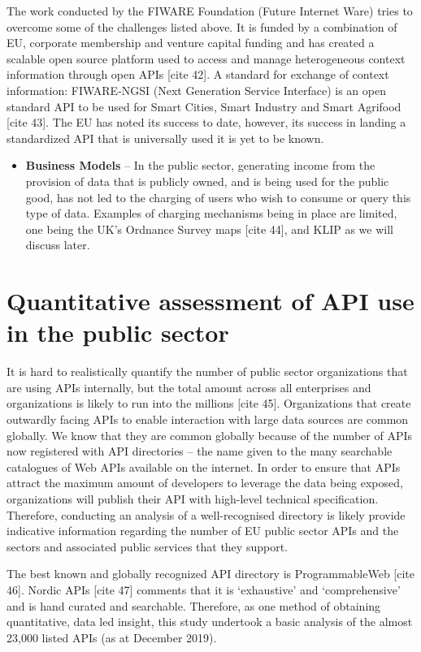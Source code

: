 The work conducted by the FIWARE Foundation (Future Internet Ware) tries to
overcome some of the challenges listed above. It is funded by a combination
of EU, corporate membership and venture capital funding and has
created a scalable open source platform used to access and manage heterogeneous context information through
open APIs [cite 42]. A standard for exchange of context information: FIWARE-NGSI
(Next Generation Service Interface) is an open standard API to be used for Smart
Cities, Smart Industry and Smart Agrifood [cite 43]. The EU has noted its success to
date, however, its success in landing a standardized API that is universally
used it is yet to be known.
\begin{itemize}
	\item \textbf{Business Models} – In the public sector, generating income from the
	provision of data that is publicly owned, and is being used for the
	public good, has not led to the charging of users who wish to consume
	or query this type of data. Examples of charging mechanisms being in place
	are	limited, one being the UK’s Ordnance Survey maps [cite 44], and KLIP 
	as we will discuss later.
\end{itemize}

\section{Quantitative assessment of API use in the public sector}

It is hard to realistically quantify the number of public sector organizations
that are using APIs internally, but the total amount across all enterprises
and organizations is likely to run into the millions [cite 45]. Organizations
that create outwardly facing APIs to enable interaction with large data sources
are common globally. We know that they are common globally because of the
number of APIs now registered with API directories – the name given to the
many searchable catalogues of Web APIs available on the internet. In order
to ensure that APIs attract the maximum amount of developers to leverage the
data being exposed, organizations will publish their API with high-level
technical specification. Therefore, conducting an analysis of a well-recognised
directory is likely provide indicative information regarding the number of EU
public sector APIs and the sectors and associated public services that they support.

The best known and globally recognized API directory is ProgrammableWeb [cite 46].
Nordic APIs [cite 47] comments that it is ‘exhaustive’ and ‘comprehensive’ and is hand
curated and searchable. Therefore, as one method of obtaining quantitative,
data led insight, this study undertook a basic analysis of the almost 23,000
listed APIs (as at December 2019).

